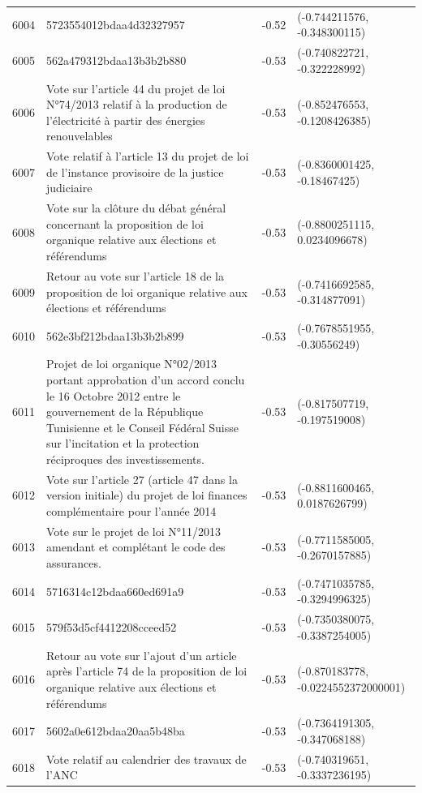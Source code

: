 \begin{table}[ht]
\begin{tabular}{rlrl}
  6004 & 5723554012bdaa4d32327957 & -0.52 & (-0.744211576, -0.348300115) \\ 
  6005 & 562a479312bdaa13b3b2b880 & -0.53 & (-0.740822721, -0.322228992) \\ 
  6006 & Vote sur l'article 44 du projet de loi N°74/2013 relatif à la production de l'électricité à partir des énergies renouvelables & -0.53 & (-0.852476553, -0.1208426385) \\ 
  6007 & Vote relatif à l'article 13 du projet de loi de l'instance provisoire de la justice judiciaire & -0.53 & (-0.8360001425, -0.18467425) \\ 
  6008 & Vote sur la clôture du débat général concernant la proposition de loi organique relative aux élections et référendums & -0.53 & (-0.8800251115, 0.0234096678) \\ 
  6009 & Retour au vote sur l'article 18 de la proposition de loi organique relative aux élections et référendums & -0.53 & (-0.7416692585, -0.314877091) \\ 
  6010 & 562e3bf212bdaa13b3b2b899 & -0.53 & (-0.7678551955, -0.30556249) \\ 
  6011 & Projet de loi organique N°02/2013 portant approbation d'un accord conclu le 16 Octobre 2012 entre le gouvernement de la République Tunisienne et le Conseil Fédéral Suisse sur l'incitation et la protection réciproques des investissements. & -0.53 & (-0.817507719, -0.197519008) \\ 
  6012 & Vote sur l'article 27 (article 47 dans la version initiale) du projet de loi finances complémentaire pour l'année 2014 & -0.53 & (-0.8811600465, 0.0187626799) \\ 
  6013 & Vote sur le projet de loi N°11/2013 amendant et complétant le code des assurances. & -0.53 & (-0.7711585005, -0.2670157885) \\ 
  6014 & 5716314c12bdaa660ed691a9 & -0.53 & (-0.7471035785, -0.3294996325) \\ 
  6015 & 579f53d5cf4412208cceed52 & -0.53 & (-0.7350380075, -0.3387254005) \\ 
  6016 & Retour au vote sur l'ajout d'un article après l'article 74 de la proposition de loi organique relative aux élections et référendums & -0.53 & (-0.870183778, -0.0224552372000001) \\ 
  6017 & 5602a0e612bdaa20aa5b48ba & -0.53 & (-0.7364191305, -0.347068188) \\ 
  6018 & Vote relatif au calendrier des travaux de l'ANC & -0.53 & (-0.740319651, -0.3337236195) \\ 

\end{tabular}
\end{table}

